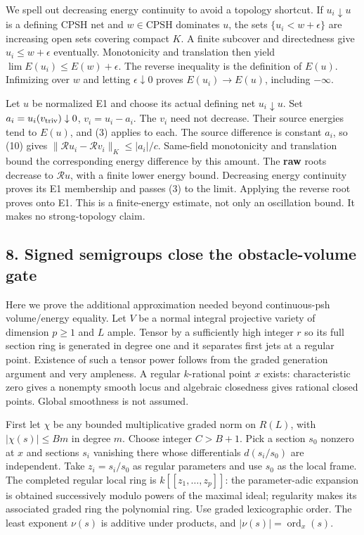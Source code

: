 \documentclass[
  10pt,
]{article}
\begin{document}
We spell out decreasing energy continuity to avoid a topology shortcut.
If \(u_i\downarrow u\) is a defining CPSH net and \(w\in\mathrm{CPSH}\)
dominates \(u\), the sets \(\{u_i<w+\epsilon\}\) are increasing open
sets covering compact \(K\). A finite subcover and directedness give
\(u_i\leq w+\epsilon\) eventually. Monotonicity and translation then
yield \(\lim E(u_i)\leq E(w)+\epsilon\). The reverse inequality is the
definition of \(E(u)\). Infimizing over \(w\) and letting
\(\epsilon\downarrow0\) proves \(E(u_i)\to E(u)\), including
\(-\infty\).

Let \(u\) be normalized E1 and choose its actual defining net
\(u_i\downarrow u\). Set \(a_i=u_i(v_{\rm triv})\downarrow0\),
\(v_i=u_i-a_i\). The \(v_i\) need not decrease. Their source energies
tend to \(E(u)\), and (3) applies to each. The source difference is
constant \(a_i\), so (10) gives
\(\|\mathcal R u_i-\mathcal R v_i\|_K\leq|a_i|/c\). Same-field
monotonicity and translation bound the corresponding energy difference
by this amount. The \textbf{raw} roots decrease to \(\mathcal R u\),
with a finite lower energy bound. Decreasing energy continuity proves
its E1 membership and passes (3) to the limit. Applying the reverse root
proves onto E1. This is a finite-energy estimate, not only an
oscillation bound. It makes no strong-topology claim.

\subsection{8. Signed semigroups close the obstacle-volume
gate}\label{signed-semigroups-close-the-obstacle-volume-gate}

Here we prove the additional approximation needed beyond continuous-psh
volume/energy equality. Let \(V\) be a normal integral projective
variety of dimension \(p\geq1\) and \(L\) ample. Tensor by a
sufficiently high integer \(r\) so its full section ring is generated in
degree one and it separates first jets at a regular point. Existence of
such a tensor power follows from the graded generation argument and very
ampleness. A regular \(k\)-rational point \(x\) exists: characteristic
zero gives a nonempty smooth locus and algebraic closedness gives
rational closed points. Global smoothness is not assumed.

First let \(\chi\) be any bounded multiplicative graded norm on
\(R(L)\), with \(|\chi(s)|\leq Bm\) in degree \(m\). Choose integer
\(C>B+1\). Pick a section \(s_0\) nonzero at \(x\) and sections \(s_i\)
vanishing there whose differentials \(d(s_i/s_0)\) are independent. Take
\(z_i=s_i/s_0\) as regular parameters and use \(s_0\) as the local
frame. The completed regular local ring is \(k[[z_1,\ldots,z_p]]\): the
parameter-adic expansion is obtained successively modulo powers of the
maximal ideal; regularity makes its associated graded ring the
polynomial ring. Use graded lexicographic order. The least exponent
\(\nu(s)\) is additive under products, and
\(|\nu(s)|=\operatorname{ord}_x(s)\).
\end{document}
